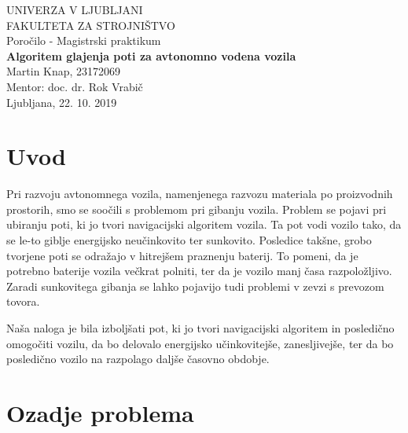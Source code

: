 \documentclass[10pt,a4paper]{article}
\begin{document}
\begin{titlepage}
	\begin{center}
		\large UNIVERZA V LJUBLJANI
		\\[1cm]
		\large FAKULTETA ZA STROJNIŠTVO
		\\[5cm]
		\large Poročilo - Magistrski praktikum
		\\[0.5cm]
		\Large\textbf{Algoritem glajenja poti za avtonomno vodena vozila}
		\\[4cm]
		Martin Knap, 23172069
		\\[0.5cm]
		Mentor: doc. dr. Rok Vrabič
		\\[5cm]
		Ljubljana, 22. 10. 2019
	\end{center}
\end{titlepage}

\tableofcontents
\listoffigures
\clearpage


\section{Uvod}

Pri razvoju avtonomnega vozila, namenjenega razvozu materiala po proizvodnih prostorih, smo se soočili s problemom pri gibanju vozila. Problem se pojavi pri ubiranju poti, ki jo tvori navigacijski algoritem vozila. Ta pot vodi vozilo tako, da se le-to giblje energijsko neučinkovito ter sunkovito. Posledice takšne, grobo tvorjene poti se odražajo v hitrejšem praznenju baterij. To pomeni, da je potrebno baterije vozila večkrat polniti, ter da je vozilo manj časa razpoložljivo. Zaradi sunkovitega gibanja se lahko pojavijo tudi problemi v zevzi s prevozom tovora. %

Naša naloga je bila izboljšati pot, ki jo tvori navigacijski algoritem in posledično omogočiti vozilu, da bo delovalo energijsko učinkovitejše, zanesljivejše, ter da bo posledično vozilo na razpolago daljše časovno obdobje.

\section{Ozadje problema}
\end{document}
